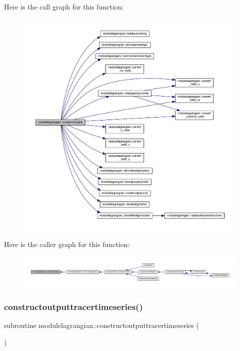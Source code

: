 Here is the call graph for this function\+:\nopagebreak
\begin{figure}[H]
\begin{center}
\leavevmode
\includegraphics[width=350pt]{namespacemodulelagrangian_a18d4f1108b3f7cc2ab468c5271bc2a42_cgraph}
\end{center}
\end{figure}
Here is the caller graph for this function\+:\nopagebreak
\begin{figure}[H]
\begin{center}
\leavevmode
\includegraphics[width=350pt]{namespacemodulelagrangian_a18d4f1108b3f7cc2ab468c5271bc2a42_icgraph}
\end{center}
\end{figure}
\mbox{\label{namespacemodulelagrangian_acead687ed0498394f861396d605a7ce9}} 
\subsubsection{\texorpdfstring{constructoutputtracertimeseries()}{constructoutputtracertimeseries()}}
{\footnotesize\ttfamily subroutine modulelagrangian\+::constructoutputtracertimeseries (\begin{DoxyParamCaption}{ }\end{DoxyParamCaption})\hspace{0.3cm}{\ttfamily [private]}}

